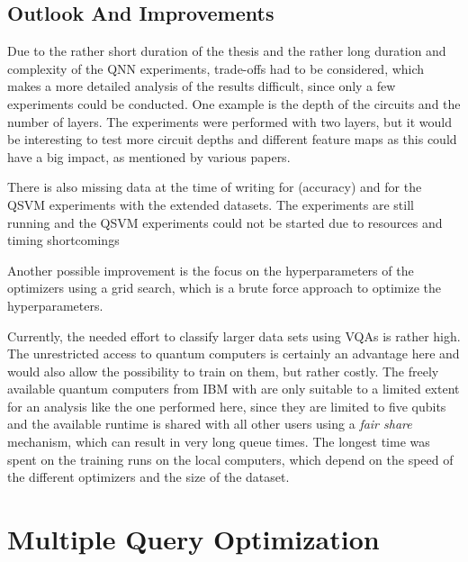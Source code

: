 \subsection{Outlook And Improvements}
Due to the rather short duration of the thesis and the rather long duration and complexity of the QNN experiments, trade-offs had to be considered, which makes a more detailed analysis of the results difficult, since only a few experiments could be conducted. One example is the depth of the circuits and the number of layers. The experiments were performed with two layers, but it would be interesting to test more circuit depths and different feature maps as this could have a big impact, as mentioned by various papers\cite{schuld_SQMLmodelsAreKernelMethods,havlicekSupervisedLearningQuantum2019,schuldCircuitcentricQuantumClassifiers2020,SchuldEffectOfDataEncoding_2021}.\par 
There is also missing data at the time of writing for  (accuracy) and for the QSVM experiments with the extended datasets. The  experiments are still running and the QSVM experiments could not be started due to resources and timing shortcomings\par
Another possible improvement is the focus on the hyperparameters of the optimizers using a grid search, which is a brute force approach to optimize the hyperparameters.\par
Currently, the needed effort to classify larger data sets using VQAs is rather high. The unrestricted access to quantum computers is certainly an advantage here and would also allow the possibility to train on them, but rather costly. The freely available quantum computers from IBM with  are only suitable to a limited extent for an analysis like the one performed here, since they are limited to five qubits and the available runtime is shared with all other users using a \textit{fair share} mechanism, which can result in very long queue times. The longest time was spent on the training runs on the local computers, which depend on the speed of the different optimizers and the size of the dataset.



\section{Multiple Query Optimization}

